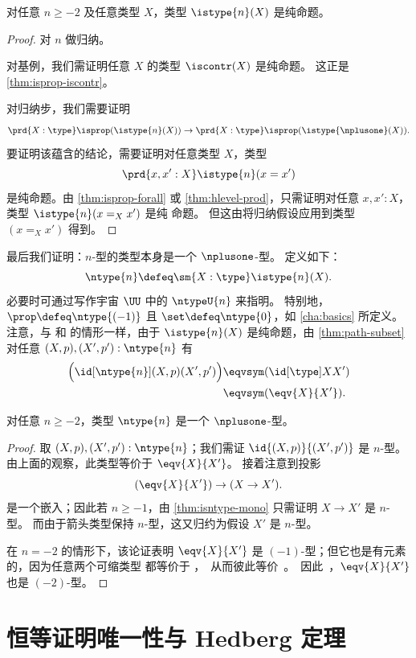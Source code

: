 \begin{thm}\label{thm:isaprop-isofhlevel}
 对任意 $n \geq -2$ 及任意类型 $X$，类型 $\istype{n}(X)$ 是纯命题。
\end{thm}
\begin{proof}
  对 $n$ 做归纳。

 对基例，我们需证明任意 $X$ 的类型 $\iscontr(X)$ 是纯命题。
 这正是 \cref{thm:isprop-iscontr}。

对归纳步，我们需要证明
\[\prd{X : \type} \isprop (\istype{n}(X)) \to \prd{X : \type} \isprop (\istype{\nplusone}(X)). \]
要证明该蕴含的结论，需要证明对任意类型 $X$，类型
\[\prd{x, x' : X}\istype{n}(x = x')\]
是纯命题。由 \cref{thm:isprop-forall} 或 \cref{thm:hlevel-prod}，只需证明对任意 $x, x' : X$，类型 $\istype{n}(x =_X x')$ 是纯
命题。
但这由将归纳假设应用到类型 $(x =_X x')$ 得到。
\end{proof}

最后我们证明：$n$-型的类型本身是一个 $\nplusone$-型。
定义如下：
\[\ntype{n} \defeq \sm{X : \type} \istype{n}(X). \]
必要时可通过写作宇宙 $\UU$ 中的 $\ntypeU{n}$ 来指明。
特别地，$\prop \defeq \ntype{(-1)}$ 且 $\set \defeq \ntype{0}$，如 \cref{cha:basics} 所定义。
注意，与 \prop 和 \set 的情形一样，由于 $\istype{n}(X)$ 是纯命题，由 \cref{thm:path-subset} 对任意 $(X,p), (X',p'):\ntype{n}$ 有
\begin{align*}
  \Big(\id[\ntype{n}]{(X, p)}{(X', p')}\Big) &\eqvsym (\id[\type] X X')\\
  &\eqvsym (\eqv{X}{X'}).
\end{align*}

\begin{thm}\label{thm:hleveln-of-hlevelSn}
 对任意 $n \geq -2$，类型 $\ntype{n}$ 是一个 $\nplusone$-型。
\end{thm}
\begin{proof}%
  取 $(X, p), (X', p') : \ntype{n}$；我们需证 $\id{(X, p)}{(X', p')}$ 是 $n$-型。
  由上面的观察，此类型等价于 $\eqv{X}{X'}$。
  接着注意到投影
  \[(\eqv{X}{X'}) \to (X \rightarrow X').\]
  是一个嵌入；因此若 $n\geq -1$，由 \cref{thm:isntype-mono} 只需证明 $X \rightarrow X'$ 是 $n$-型。
  而由于箭头类型保持 $n$-型，这又归约为假设 $X'$ 是 $n$-型。

  在 $n=-2$ 的情形下，该论证表明 $\eqv{X}{X'}$ 是 $(-1)$-型；但它也是有元素的，因为任意两个可缩类型
都等价于 \unit，从而彼此等价。
  因此，$\eqv{X}{X'}$ 也是 $(-2)$-型。
\end{proof}
\section{恒等证明唯一性与 Hedberg 定理}
\label{sec:hedberg}

